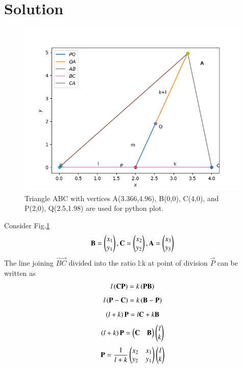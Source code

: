 \documentclass[journal,12pt,twocolumn]{IEEEtran}
\begin{document}
\section{Solution}
\begin{figure}[h!]
       \centering
        \includegraphics[width =\linewidth]{Figure_1.png}
        \caption{Triangle ABC with vertices A(3.366,4.96), B(0,0), C(4,0), and P(2,0), Q(2.5,1.98) are used for python plot.}\label{t1}
\end{figure}
Consider Fig.\ref{t1}
\begin{align}
    \mathbf{B}=\begin{pmatrix}x_1\\y_1\end{pmatrix},
    \mathbf{C}=\begin{pmatrix}x_2\\y_2\end{pmatrix},
     \mathbf{A}=\begin{pmatrix}x_3\\y_3\end{pmatrix}
\end{align}
The line joining  $\vec{BC}$ divided into the ratio l:k at point of division $\vec{P}$ can be written as
\begin{align}
    l\left(\mathbf{CP}\right)=k\left(\mathbf{PB}\right)
\end{align}
\begin{align}
    l\left(\mathbf{P-C}\right)=k\left(\mathbf{B-P}\right)
\end{align}
\begin{align}
    \left(l+k\right)\mathbf{P}=l\mathbf{C}+k\mathbf{B}
\end{align}
\begin{align}
    \left(l+k\right)\mathbf{P}=\begin{pmatrix}\mathbf{C} & \mathbf{B}\end{pmatrix}\begin{pmatrix}l\\k\end{pmatrix}
\end{align}
\begin{align}
     \mathbf{P}=\frac{1}{l+k}\begin{pmatrix}x_2&x_1\\y_2&y_1\end{pmatrix}\begin{pmatrix}l\\k\end{pmatrix}
\end{align}
\end{document}
